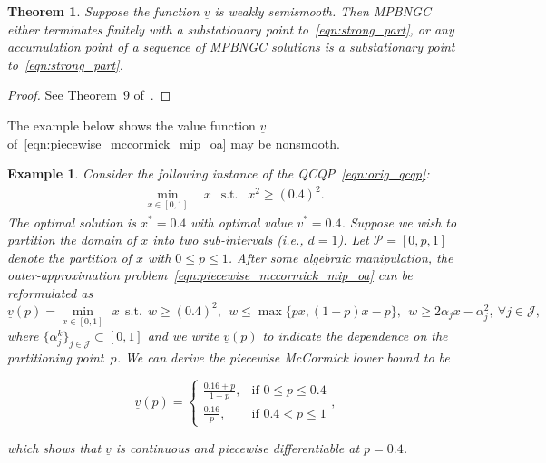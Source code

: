 \documentclass{article}
\newcommand{\pmc}{piecewise McCormick}
\newcommand{\uset}[2]{\ensuremath{\underset{#1}{#2}}}
\newtheorem{theorem}{Theorem}[]
\newtheorem{example}{Example}
\begin{document}
\begin{theorem}
Suppose the function $\underline{v}$ is weakly semismooth.
Then MPBNGC either terminates finitely with a substationary point to~\eqref{eqn:strong_part}, or any accumulation point of a sequence of MPBNGC solutions is a substationary point to~\eqref{eqn:strong_part}.
\end{theorem}
\begin{proof}
See Theorem~9 of~\cite{makela2003multiobjective}.
\end{proof}



The example below shows the value function $\underline{v}$ of~\eqref{eqn:piecewise_mccormick_mip_oa} may be nonsmooth.

\begin{example}
\label{exm:nonsmooth_value_fn}
Consider the following instance of the QCQP~\eqref{eqn:orig_qcqp}:
\begin{align*}
\min_{x \in [0,1]} \:\: & x \:\: \text{ s.t. } \:\: x^2 \geq (0.4)^2.
\end{align*}
The optimal solution is $x^* = 0.4$ with optimal value $v^* = 0.4$.
Suppose we wish to partition the domain of $x$ into two sub-intervals (i.e., $d = 1$).
Let $\mathcal{P} = [0, p, 1]$ denote the partition of $x$ with $0 \leq p \leq 1$.
After some algebraic manipulation, the outer-approximation problem~\eqref{eqn:piecewise_mccormick_mip_oa} can be reformulated as
\begin{equation*}
\underline{v}(p) = \uset{x \in [0,1]}{\min} \:\: x \:\: \text{s.t.} \:\: w \geq (0.4)^2, \:\: w \leq \max\{px, (1+p)x - p\}, \:\: w \geq 2\alpha_j x - \alpha^2_j, \: \forall j \in \mathcal{J},
\end{equation*}
where $\{\alpha^k_j\}_{j \in \mathcal{J}} \subset [0,1]$
and we write $\underline{v}(p)$ to indicate the dependence on the partitioning point~$p$.
We can derive the {\pmc} lower bound to be 


\begin{minipage}[t]{0.4\textwidth}
\vspace*{-0.85in}
\[
\underline{v}(p) = 
\begin{cases}
\frac{0.16+p}{1+p}, & \text{if $0 \leq p \leq 0.4$}\\
\frac{0.16}{p}, & \text{if $0.4 < p \leq 1$}
\end{cases},
\]
\end{minipage}
\hfill
\begin{minipage}[t]{0.5\textwidth}
\centering

\end{minipage}

\noindent which shows that $\underline{v}$ is continuous and piecewise differentiable at $p = 0.4$.
\end{example}
\end{document}
